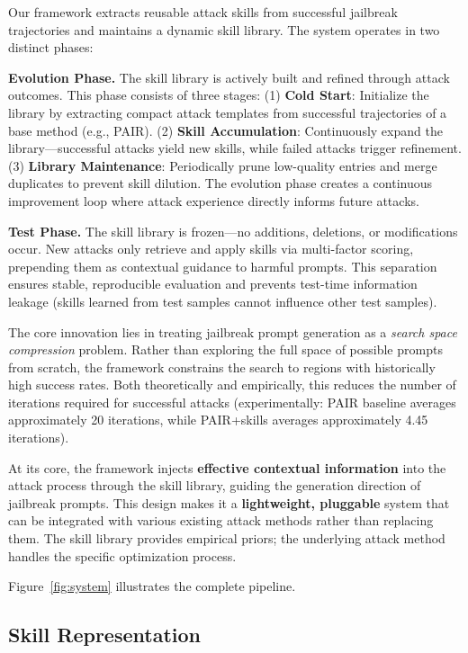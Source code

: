 \documentclass[letterpaper]{article}
\begin{document}
Our framework extracts reusable attack skills from successful jailbreak trajectories and maintains a dynamic skill library. The system operates in two distinct phases:

\textbf{Evolution Phase.} The skill library is actively built and refined through attack outcomes. This phase consists of three stages: (1) \textbf{Cold Start}: Initialize the library by extracting compact attack templates from successful trajectories of a base method (e.g., PAIR). (2) \textbf{Skill Accumulation}: Continuously expand the library---successful attacks yield new skills, while failed attacks trigger refinement. (3) \textbf{Library Maintenance}: Periodically prune low-quality entries and merge duplicates to prevent skill dilution. The evolution phase creates a continuous improvement loop where attack experience directly informs future attacks.

\textbf{Test Phase.} The skill library is frozen---no additions, deletions, or modifications occur. New attacks only retrieve and apply skills via multi-factor scoring, prepending them as contextual guidance to harmful prompts. This separation ensures stable, reproducible evaluation and prevents test-time information leakage (skills learned from test samples cannot influence other test samples).

The core innovation lies in treating jailbreak prompt generation as a \emph{search space compression} problem. Rather than exploring the full space of possible prompts from scratch, the framework constrains the search to regions with historically high success rates. Both theoretically and empirically, this reduces the number of iterations required for successful attacks (experimentally: PAIR baseline averages approximately 20 iterations, while PAIR+skills averages approximately 4.45 iterations).

At its core, the framework injects \textbf{effective contextual information} into the attack process through the skill library, guiding the generation direction of jailbreak prompts. This design makes it a \textbf{lightweight, pluggable} system that can be integrated with various existing attack methods rather than replacing them. The skill library provides empirical priors; the underlying attack method handles the specific optimization process.

Figure~\ref{fig:system} illustrates the complete pipeline.

\subsection{Skill Representation}
\end{document}
